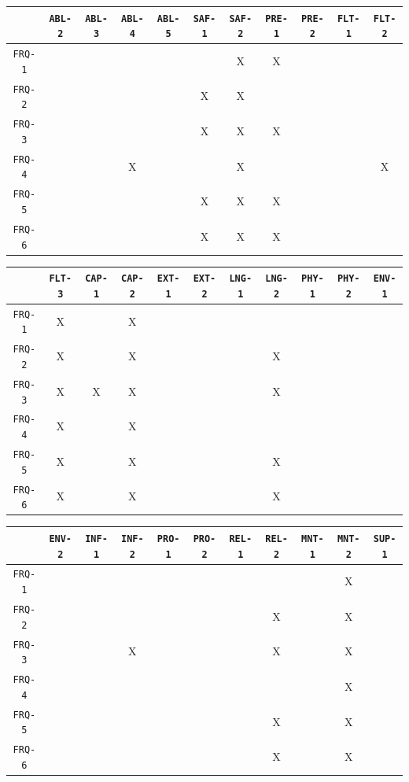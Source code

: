 \documentclass[12pt]{article}
\begin{document}
\begin{tabular}{|c|c|c|c|c|c|c|c|c|c|c|}
\hline
	& \texttt{ABL-2} & \texttt{ABL-3} & \texttt{ABL-4} & \texttt{ABL-5} & \texttt{SAF-1} & \texttt{SAF-2} & \texttt{PRE-1} & \texttt{PRE-2} & \texttt{FLT-1} & \texttt{FLT-2} \\
\hline
\texttt{FRQ-1} &  &  &  &  &  & X & X &  &  &  \\ \hline
\texttt{FRQ-2} &  &  &  &  & X & X &  &  &  &  \\ \hline
\texttt{FRQ-3} &  &  &  &  & X & X & X &  &  &  \\ \hline
\texttt{FRQ-4} &  &  & X &  &  & X &  &  &  & X \\ \hline
\texttt{FRQ-5} &  &  &  &  & X & X & X &  &  &  \\ \hline
\texttt{FRQ-6} &  &  &  &  & X & X & X &  &  &  \\ \hline
\end{tabular}

\begin{tabular}{|c|c|c|c|c|c|c|c|c|c|c|}
\hline
	& \texttt{FLT-3} & \texttt{CAP-1} & \texttt{CAP-2} & \texttt{EXT-1} & \texttt{EXT-2} & \texttt{LNG-1} & \texttt{LNG-2} & \texttt{PHY-1} & \texttt{PHY-2} & \texttt{ENV-1} \\
\hline
\texttt{FRQ-1} & X &  & X &  &  &  &  &  &  &  \\ \hline
\texttt{FRQ-2} & X &  & X &  &  &  & X &  &  &  \\ \hline
\texttt{FRQ-3} & X & X & X &  &  &  & X &  &  &  \\ \hline
\texttt{FRQ-4} & X &  & X &  &  &  &  &  &  &  \\ \hline
\texttt{FRQ-5} & X &  & X &  &  &  & X &  &  &  \\ \hline
\texttt{FRQ-6} & X &  & X &  &  &  & X &  &  &  \\ \hline
\end{tabular}

\begin{tabular}{|c|c|c|c|c|c|c|c|c|c|c|}
\hline
	& \texttt{ENV-2} & \texttt{INF-1} & \texttt{INF-2} & \texttt{PRO-1} & \texttt{PRO-2} & \texttt{REL-1} & \texttt{REL-2} & \texttt{MNT-1} & \texttt{MNT-2} & \texttt{SUP-1} \\
\hline
\texttt{FRQ-1} &  &  &  &  &  &  &  &  & X &  \\ \hline
\texttt{FRQ-2} &  &  &  &  &  &  & X &  & X &  \\ \hline
\texttt{FRQ-3} &  &  & X &  &  &  & X &  & X &  \\ \hline
\texttt{FRQ-4} &  &  &  &  &  &  &  &  & X &  \\ \hline
\texttt{FRQ-5} &  &  &  &  &  &  & X &  & X &  \\ \hline
\texttt{FRQ-6} &  &  &  &  &  &  & X &  & X &  \\ \hline
\end{tabular}
\end{document}
